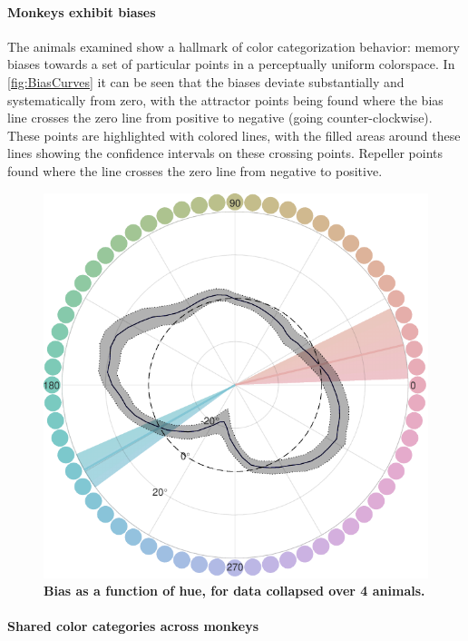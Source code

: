 
\paragraph{Monkeys exhibit biases} %

The animals examined show a hallmark of color categorization behavior: memory biases towards a set of particular points in a perceptually uniform colorspace.
In \autoref{fig:BiasCurves} it can be seen that the biases deviate substantially and systematically from zero, with the attractor points being found where the bias line crosses the zero line from positive to negative (going counter-clockwise). These points are highlighted with colored lines, with the filled areas around these lines showing the confidence intervals on these crossing points. Repeller points found where the line crosses the zero line from negative to positive.

\begin{figure}
\includegraphics[width=\linewidth]{../../../Analyses/combined/combined_categorybias2_230225.pdf}
\caption{\textbf{Bias as a function of hue, for data collapsed over 4 animals.} 
}
\label{fig:BiasCurvesCombined}
\end{figure}

\paragraph{Shared color categories across monkeys}

